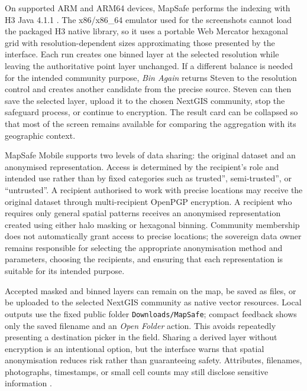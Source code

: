 \documentclass[a4paper,UKenglish,cleveref,autoref,thm-restate]{lipics-v2021}
\begin{document}
On supported ARM and ARM64 devices, MapSafe performs the indexing with H3 Java 4.1.1 \citep{sahr2003geodesic,uber2018h3}. The x86/x86\_64 emulator used for the screenshots cannot load the packaged H3 native library, so it uses a portable Web Mercator hexagonal grid with resolution-dependent sizes approximating those presented by the interface. Each run creates one binned layer at the selected resolution while leaving the authoritative point layer unchanged. If a different balance is needed for the intended community purpose, \emph{Bin Again} returns Steven to the resolution control and creates another candidate from the precise source. Steven can then save the selected layer, upload it to the chosen NextGIS community, stop the safeguard process, or continue to encryption. The result card can be collapsed so that most of the screen remains available for comparing the aggregation with its geographic context.

MapSafe Mobile supports two levels of data sharing: the original dataset and an anonymised representation. Access is determined by the recipient’s role and intended use rather than by fixed categories such as trusted'', semi-trusted'', or ``untrusted''. A recipient authorised to work with precise locations may receive the original dataset through multi-recipient OpenPGP encryption. A recipient who requires only general spatial patterns receives an anonymised representation created using either halo masking or hexagonal binning. Community membership does not automatically grant access to precise locations; the sovereign data owner remains responsible for selecting the appropriate anonymisation method and parameters, choosing the recipients, and ensuring that each representation is suitable for its intended purpose.







Accepted masked and binned layers can remain on the map, be saved as files, or be uploaded to the selected NextGIS community as native vector resources. Local outputs use the fixed public folder \texttt{Downloads/MapSafe}; compact feedback shows only the saved filename and an \emph{Open Folder} action. This avoids repeatedly presenting a destination picker in the field. Sharing a derived layer without encryption is an intentional option, but the interface warns that spatial anonymisation reduces risk rather than guaranteeing safety. Attributes, filenames, photographs, timestamps, or small cell counts may still disclose sensitive information \citep{kessler2018geoprivacy,cassa2008re,zimmerman2008quantifying}.
\end{document}
